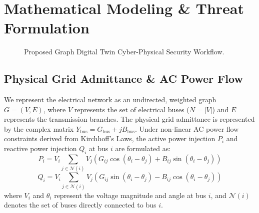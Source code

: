 \documentclass[conference]{IEEEtran}
\begin{document}
\section{Mathematical Modeling \& Threat Formulation}

\begin{figure}[htbp]
\centering
{}
\caption{Proposed Graph Digital Twin Cyber-Physical Security Workflow.}
\label{fig:flowchart}
\end{figure}

\subsection{Physical Grid Admittance \& AC Power Flow}
We represent the electrical network as an undirected, weighted graph $G = (V, E)$, where $V$ represents the set of electrical buses ($N = |V|$) and $E$ represents the transmission branches. The physical grid admittance is represented by the complex matrix $Y_{\text{bus}} = G_{\text{bus}} + jB_{\text{bus}}$. Under non-linear AC power flow constraints derived from Kirchhoff's Laws, the active power injection $P_i$ and reactive power injection $Q_i$ at bus $i$ are formulated as:
\begin{equation}
P_i = V_i \sum_{j \in \mathcal{N}(i)} V_j \left( G_{ij} \cos(\theta_i - \theta_j) + B_{ij} \sin(\theta_i - \theta_j) \right)
\end{equation}
\begin{equation}
Q_i = V_i \sum_{j \in \mathcal{N}(i)} V_j \left( G_{ij} \sin(\theta_i - \theta_j) - B_{ij} \cos(\theta_i - \theta_j) \right)
\end{equation}
where $V_i$ and $\theta_i$ represent the voltage magnitude and angle at bus $i$, and $\mathcal{N}(i)$ denotes the set of buses directly connected to bus $i$.
\end{document}

